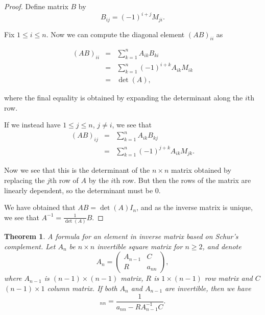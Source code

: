 \documentclass[12pt,a4paper,leqno]{report}
\theoremstyle{plain}
\newtheorem{theo}[equation]{Theorem}
\theoremstyle{definition}
\theoremstyle{remark}
\begin{document}
\begin{proof}
Define matrix $B$ by
\begin{equation*}
B_{ij} = (-1)^{i+j}M_{ji}.
\end{equation*}

Fix $1\leq i\leq n$. Now we can compute the diagonal element $(AB)_{ii}$ as

\begin{eqnarray*}
(AB)_{ii} & = & \sum_{k=1}^{n} A_{ik}B_{ki}\\
& = & \sum_{k=1}^{n} (-1)^{i+k} A_{ik}M_{ik}\\
& = & \det(A),
\end{eqnarray*}

where the final equality is obtained by expanding the determinant along the $i$th row.

If we instead have $1\leq j \leq n$, $j\neq i$, we see that
\begin{eqnarray*}
(AB)_{ij} & = & \sum_{k=1}^{n} A_{ik}B_{kj}\\
& = & \sum_{k=1}^{n} (-1)^{j+k} A_{ik}M_{jk}.
\end{eqnarray*}

Now we see that this is the determinant of the $n \times n$ matrix obtained by replacing the $j$th row of $A$ by the $i$th row. But then the rows of the matrix are linearly dependent, so the determinant must be $0$.

We have obtained that $AB = \det(A)I_n$, and as the inverse matrix is unique, we see that $A^{-1} = \frac{1}{\det(A)}B$.
\end{proof}

\begin{theo}
A formula for an element in inverse matrix based on Schur's complement. Let $A_n$ be $n \times n$ invertible square matrix for $n\geq 2$, and denote
\begin{equation*}
A_n =
\begin{pmatrix}
A_{n-1} & C \\
R & a_{nn}
\end{pmatrix} ,
\end{equation*}
where $A_{n-1}$ is $(n-1) \times (n-1)$ matrix, $R$ is $1 \times (n-1)$ row matrix and $C$ $(n-1) \times 1$ column matrix. If both $A_n$ and $A_{n-1}$ are invertible, then we have
\begin{equation*}
[A_n^{-1}]_{nn} = \frac{1}{a_{nn}-R A_{n-1}^{-1} C}.
\end{equation*}
\end{theo}
\end{document}
